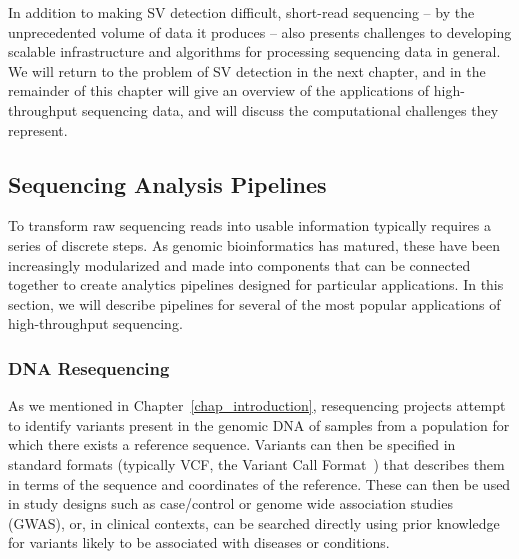 In addition to making SV detection difficult, short-read sequencing -- by the unprecedented volume of data it produces -- also presents challenges to developing scalable infrastructure and algorithms for processing sequencing data in general. We will return to the problem of SV detection in the next chapter, and in the remainder of this chapter will give an overview of the applications of high-throughput sequencing data, and will discuss the computational challenges they represent.

\subsection{Sequencing Analysis Pipelines}\label{section_pipelines}

To transform raw sequencing reads into usable information typically requires a series of discrete steps. As genomic bioinformatics has matured, these have been increasingly modularized and made into components that can be connected together to create analytics pipelines designed for particular applications. In this section, we will describe pipelines for several of the most popular applications of high-throughput sequencing.

\subsubsection{DNA Resequencing}

As we mentioned in Chapter~\ref{chap_introduction}, resequencing projects attempt to identify variants present in the genomic DNA of samples from a population for which there exists a reference sequence. Variants can then be specified in standard formats (typically VCF, the Variant Call Format~\cite{Danecek:2011gz}) that describes them in terms of the sequence and coordinates of the reference. These can then be used in study designs such as case/control or genome wide association studies (GWAS), or, in clinical contexts, can be searched directly using prior knowledge for variants likely to be associated with diseases or conditions.

